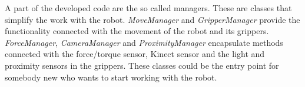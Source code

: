         A part of the developed code are the so called managers. These are classes that simplify the work with the \CloPeMa\/ robot. \emph{MoveManager} and \emph{GripperManager} provide the functionality connected with the movement of the robot and its grippers. \emph{ForceManager}, \emph{CameraManager} and \emph{ProximityManager} encapsulate methods connected with the force/torque sensor, Kinect sensor and the light and proximity sensors in the grippers. These classes could be the entry point for somebody new who wants to start working with the robot.



\clearpage 